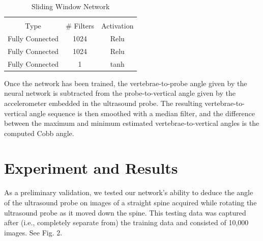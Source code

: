 \documentclass{article}
\begin{document}
\begin{table}[ht]
\caption{Sliding Window Network}
\begin{tabular}{c c c}
\hline \\
Type & \# Filters & Activation \\
\hline
Fully Connected & 1024  & Relu \\
Fully Connected & 1024  & Relu \\
Fully Connected & 1 &  tanh \\
\end{tabular}
\end{table}

Once the network has been trained, the vertebrae-to-probe angle given by the neural network is subtracted from the probe-to-vertical angle given by the accelerometer embedded in the ultrasound probe. The resulting vertebrae-to-vertical angle sequence is then smoothed with a median filter, and the difference between the maximum and minimum estimated vertebrae-to-vertical angles is the computed Cobb angle.   

\section{Experiment and Results}

As a preliminary validation, we tested our network’s ability to deduce the angle of the ultrasound probe on images of a straight spine acquired while rotating the ultrasound probe as it moved down the spine.  This testing data was captured after (i.e., completely separate from) the training data and consisted of 10,000 images.  See Fig. 2.
\end{document}
